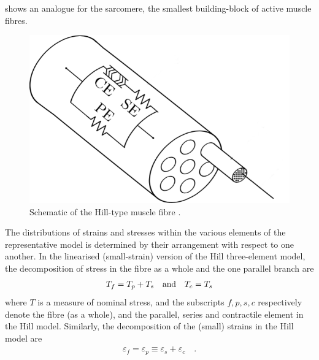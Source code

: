 \documentclass[]{scrartcl}
\begin{document}
 shows an analogue for the sarcomere, the smallest building-block of active muscle fibres.
\begin{figure}[!ht]
\centering
\includegraphics[height=0.23\textheight]{./muscle_fibre-hill_model.png}
\caption{Schematic of the Hill-type muscle fibre \citep{Kajee2013a}.
\label{fig: Hill three-element model}
}
\end{figure}
The distributions of strains and stresses within the various elements of the representative model is determined by their arrangement with respect to one another.
In the linearised (small-strain) version of the Hill three-element model, the decomposition of stress in the fibre as a whole and the one parallel branch are
\begin{gather}
T_{f}
  = T_{p} + T_{s}
\quad\textnormal{and}\quad
T_{c} 
  = T_{s}
\end{gather}
where $T$ is a measure of nominal stress,
and the subscripts $f,p,s,c$ respectively denote the fibre (as a whole), and the parallel, series and contractile element in the Hill model.
Similarly, the decomposition of the (small) strains in the Hill model are
\begin{gather}
\varepsilon_{f}
  = \varepsilon_{p}
  \equiv \varepsilon_{s} + \varepsilon_{c}
\quad .
\end{gather}
\end{document}
